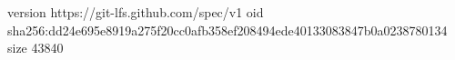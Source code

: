version https://git-lfs.github.com/spec/v1
oid sha256:dd24e695e8919a275f20cc0afb358ef208494ede40133083847b0a0238780134
size 43840
